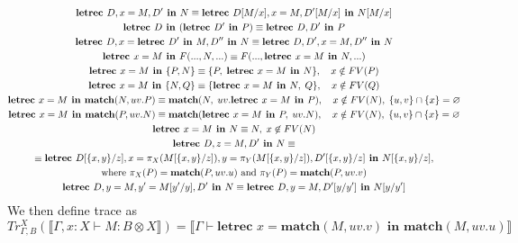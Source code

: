 \begin{subequations}\label{eq:let_equations}
\begin{gather}
\textbf{letrec } D, x = M, D' \textbf{ in } N  \equiv  \textbf{letrec } D[M/x], x = M, D'[M/x] \textbf{ in } N[M/x]\label{eq:let_equations:subst}\\
\textbf{letrec } D \textbf{ in } (\textbf{letrec } D' \textbf{ in } P) \equiv \textbf{letrec } D,D' \textbf{ in } P \label{eq:let_equations:merge_body}\\
\textbf{letrec } D, x = \textbf{letrec } D' \textbf{ in } M, D'' \textbf{ in } N \equiv \textbf{letrec } D,D',x = M, D'' \textbf{ in } N\label{eq:let_equations:merge_bind}\\
  \textbf{letrec } x = M \textbf{ in } F(..., N, ...) \equiv F(..., \textbf{letrec } x = M \textbf{ in } N, ...)\label{eq:let_equations:congruence}\\ 
  \textbf{letrec } x = M \textbf{ in } \{P, N\} \equiv \{P,\; \textbf{letrec } x = M \textbf{ in } N\},
    \quad x \notin FV(P) \label{eq:let_equations:float-tensor-R}\\
  \textbf{letrec } x = M \textbf{ in } \{N, Q\} \equiv \{\textbf{letrec } x = M \textbf{ in } N,\; Q\},
    \quad x \notin FV(Q) \label{eq:let_equations:float-tensor-L}\\
  \textbf{letrec } x = M \textbf{ in } \textbf{match}(N, uv.P) \equiv
    \textbf{match}(N,\; uv.\textbf{letrec } x = M \textbf{ in } P),
    \quad x \notin FV(N),\; \{u,v\}\cap\{x\}=\varnothing \label{eq:let_equations:float-match-body}\\
  \textbf{letrec } x = M \textbf{ in } \textbf{match}(P, uv.N) \equiv
    \textbf{match}(\textbf{letrec } x = M \textbf{ in } P,\; uv.N),
    \quad x \notin FV(N),\; \{u,v\}\cap\{x\}=\varnothing \label{eq:let_equations:float-match-scrutinee}\\
  \textbf{letrec } x = M \textbf{ in } N \equiv N,\;x \not \in FV(N)\label{eq:let_equations:gc}\\
\textbf{letrec } D, z = M, D' \textbf{ in } N \equiv\notag\\
\equiv \textbf{letrec } D[\{x,y\}/z], x = \pi_{X}(M[\{x,y\}/z]), y = \pi_{Y}(M[\{x,y\}/z]), D'[\{x,y\}/z] \textbf{ in } N[\{x,y\} / z],\notag\\
\text{where $\pi_{X}(P) = \textbf{match}(P, uv.u)$ and $\pi_{Y}(P) = \textbf{match}(P, uv.v)$}\label{eq:let_equations:unpair}\\
\textbf{letrec } D, y = M, y' = M[y'/y], D' \textbf{ in } N \equiv \textbf{letrec } D, y = M, D'[y/y'] \textbf{ in } N[y/y']\label{eq:let_equations:diag}
\end{gather}
\end{subequations}
We then define trace as
\[
Tr_{\Gamma,B}^{X}(\llbracket \Gamma, x : X \vdash M : B \otimes X \rrbracket) = \llbracket \Gamma \vdash \textbf{letrec } x = \textbf{match}(M, uv.v) \textbf{ in } \textbf{match}(M, uv.u) \rrbracket
\]


